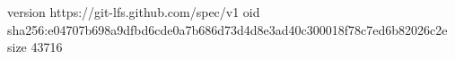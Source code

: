 version https://git-lfs.github.com/spec/v1
oid sha256:e04707b698a9dfbd6cde0a7b686d73d4d8e3ad40c300018f78c7ed6b82026c2e
size 43716
